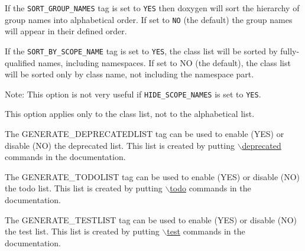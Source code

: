 \begin{description}
\label{config_cfg_sort_group_names}
\hypertarget{config_cfg_sort_group_names}{}
 \item[{\tt SORT\_\-GROUP\_\-NAMES} ] If the {\tt SORT\_\-GROUP\_\-NAMES} tag is set to {\tt YES} then doxygen will sort the hierarchy of group names into alphabetical order. If set to {\tt NO} (the default) the group names will appear in their defined order.

\label{config_cfg_sort_by_scope_name}
\hypertarget{config_cfg_sort_by_scope_name}{}
 \item[{\tt SORT\_\-BY\_\-SCOPE\_\-NAME} ] If the {\tt SORT\_\-BY\_\-SCOPE\_\-NAME} tag is set to {\tt YES}, the class list will be sorted by fully-qualified names, including namespaces. If set to NO (the default), the class list will be sorted only by class name, not including the namespace part. \begin{Desc}
\item[Note:]This option is not very useful if {\tt HIDE\_\-SCOPE\_\-NAMES} is set to {\tt YES}. 

This option applies only to the class list, not to the alphabetical list.\end{Desc}
\label{config_cfg_generate_deprecatedlist}
\hypertarget{config_cfg_generate_deprecatedlist}{}
 \item[{\tt GENERATE\_\-DEPRECATEDLIST} ] The GENERATE\_\-DEPRECATEDLIST tag can be used to enable (YES) or disable (NO) the deprecated list. This list is created by putting \hyperlink{commands_cmddeprecated}{$\backslash$deprecated} commands in the documentation.

\label{config_cfg_generate_todolist}
\hypertarget{config_cfg_generate_todolist}{}
 \item[{\tt GENERATE\_\-TODOLIST} ] The GENERATE\_\-TODOLIST tag can be used to enable (YES) or disable (NO) the todo list. This list is created by putting \hyperlink{commands_cmdtodo}{$\backslash$todo} commands in the documentation.

\label{config_cfg_generate_testlist}
\hypertarget{config_cfg_generate_testlist}{}
 \item[{\tt GENERATE\_\-TESTLIST} ] The GENERATE\_\-TESTLIST tag can be used to enable (YES) or disable (NO) the test list. This list is created by putting \hyperlink{commands_cmdtest}{$\backslash$test} commands in the documentation.


\end{description}
